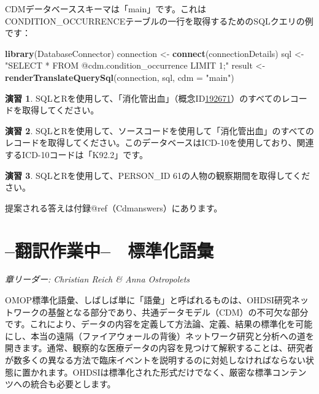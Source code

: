 \documentclass[
  11pt]{book}
\newenvironment{Shaded}{\begin{snugshade}}{\end{snugshade}}
\newcommand{\AttributeTok}[1]{\textcolor[rgb]{0.13,0.29,0.53}{#1}}
\newcommand{\FunctionTok}[1]{\textcolor[rgb]{0.13,0.29,0.53}{\textbf{#1}}}
\newcommand{\NormalTok}[1]{#1}
\newcommand{\OtherTok}[1]{\textcolor[rgb]{0.56,0.35,0.01}{#1}}
\newcommand{\StringTok}[1]{\textcolor[rgb]{0.31,0.60,0.02}{#1}}
\theoremstyle{definition}
\theoremstyle{definition}
\theoremstyle{definition}
\newtheorem{exercise}{演習}[chapter]
\theoremstyle{definition}
\theoremstyle{remark}
\begin{document}
CDMデータベーススキーマは「main」です。これはCONDITION\_OCCURRENCEテーブルの一行を取得するためのSQLクエリの例です：

\begin{Shaded}
\begin{Highlighting}[]
\FunctionTok{library}\NormalTok{(DatabaseConnector)}
\NormalTok{connection }\OtherTok{\textless{}{-}} \FunctionTok{connect}\NormalTok{(connectionDetails)}
\NormalTok{sql }\OtherTok{\textless{}{-}} \StringTok{"SELECT *}
\StringTok{FROM @cdm.condition\_occurrence}
\StringTok{LIMIT 1;"}
\NormalTok{result }\OtherTok{\textless{}{-}} \FunctionTok{renderTranslateQuerySql}\NormalTok{(connection, sql, }\AttributeTok{cdm =} \StringTok{"main"}\NormalTok{)}
\end{Highlighting}
\end{Shaded}

\begin{exercise}
\protect\hypertarget{exr:exerciseGiBleedRecords}{}\label{exr:exerciseGiBleedRecords}SQLとRを使用して、「消化管出血」（概念ID\href{http://athena.ohdsi.org/search-terms/terms/192671}{192671}）のすべてのレコードを取得してください。
\end{exercise}

\begin{exercise}
\protect\hypertarget{exr:exercisePersonSource}{}\label{exr:exercisePersonSource}SQLとRを使用して、ソースコードを使用して「消化管出血」のすべてのレコードを取得してください。このデータベースはICD-10を使用しており、関連するICD-10コードは「K92.2」です。
\end{exercise}

\begin{exercise}
\protect\hypertarget{exr:exercisePerson61Records}{}\label{exr:exercisePerson61Records}SQLとRを使用して、PERSON\_ID 61の人物の観察期間を取得してください。
\end{exercise}

提案される答えは付録@ref（Cdmanswers）にあります。

\chapter{--翻訳作業中--　標準化語彙}\label{StandardizedVocabularies}


\emph{章リーダー: Christian Reich \& Anna Ostropolets}

OMOP標準化語彙、しばしば単に「語彙」と呼ばれるものは、OHDSI研究ネットワークの基盤となる部分であり、共通データモデル（CDM）の不可欠な部分です。これにより、データの内容を定義して方法論、定義、結果の標準化を可能にし、本当の遠隔（ファイアウォールの背後）ネットワーク研究と分析への道を開きます。通常、観察的な医療データの内容を見つけて解釈することは、研究者が数多くの異なる方法で臨床イベントを説明するのに対処しなければならない状態に置かれます。OHDSIは標準化された形式だけでなく、厳密な標準コンテンツへの統合も必要とします。
\end{document}
